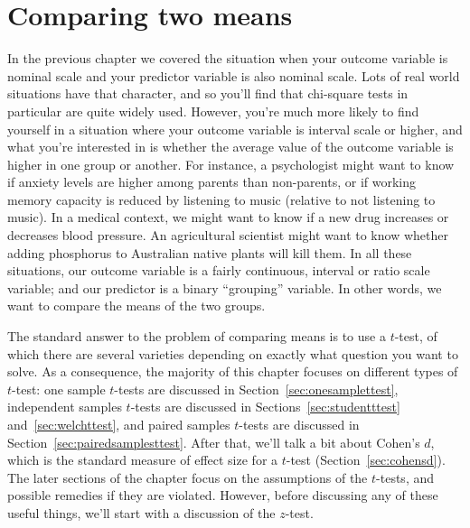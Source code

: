 

\chapter{Comparing two means \label{ch:ttest}}


In the previous chapter we covered the situation when your outcome variable is nominal scale and your predictor variable is also nominal scale. Lots of real world situations have that character, and so you'll find that chi-square tests in particular are quite widely used. However, you're much more likely to find yourself in a situation where your outcome variable is interval scale or higher, and what you're interested in is whether the average value of the outcome variable is higher in one group or another. For instance, a psychologist might want to know if anxiety levels are higher among parents than non-parents, or if working memory capacity is reduced by listening to music (relative to not listening to music). In a medical context, we might want to know if a new drug increases or decreases blood pressure. An agricultural scientist might want to know whether adding phosphorus to Australian native plants will kill them. In all these situations, our outcome variable is a fairly continuous, interval or ratio scale variable; and our predictor is a binary ``grouping'' variable. In other words, we want to compare the means of the two groups. 

The standard answer to the problem of comparing means is to use a $t$-test, of which there are several varieties depending on exactly what question you want to solve. As a consequence, the majority of this chapter focuses on different types of $t$-test: one sample $t$-tests are discussed in Section~\ref{sec:onesamplettest}, independent samples $t$-tests are discussed in Sections~\ref{sec:studentttest} and~\ref{sec:welchttest}, and paired samples $t$-tests are discussed in Section~\ref{sec:pairedsamplesttest}. After that, we'll talk a bit about Cohen's $d$, which is the standard measure of effect size for a $t$-test (Section~\ref{sec:cohensd}). The later sections of the chapter focus on the assumptions of the $t$-tests, and possible remedies if they are violated. However, before discussing any of these useful things, we'll start with a discussion of the $z$-test. 


